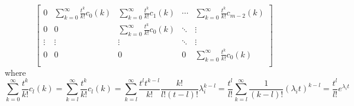 \documentclass[12pt,a4paper]{article}
\begin{document}
\begin{itemize}
\begin{enumerate}
\begin{equation}
\begin{bmatrix}
        0 & \sum_{k=0}^{\infty}\frac{t^{k}}{k!}c_{0}(k) & \sum_{k=0}^{\infty}\frac{t^{k}}{k!}c_{1}(k) & \cdots & \sum_{k=0}^{\infty}\frac{t^{k}}{k!}c_{m-2}(k) \\
        0 & 0 & \sum_{k=0}^{\infty}\frac{t^{k}}{k!}c_{0}(k) & \ddots & \vdots \\
        \vdots & \vdots & \vdots & \ddots & \vdots \\
        0 & 0 & 0  & 0 & \sum_{k=0}^{\infty}\frac{t^{k}}{k!}c_{0}(k) \\
      \end{bmatrix}
    \end{equation}
    where
    \begin{equation}\nonumber%
      \sum_{k=0}^{\infty}\frac{t^{k}}{k!}c_{l}(k)
      = 
      \sum_{k=l}^{\infty}\frac{t^{k}}{k!}c_{l}(k)
      = 
      \sum_{k=l}^{\infty}\frac{t^{l}t^{k-l}}{k!}\frac{k!}{l!(t-l)!}\lambda_{i}^{k-l}
      = 
      \frac{t^{l}}{l!}\sum_{k=l}^{\infty}\frac{1}{(k-l)!}(\lambda_{i}t)^{k-l}
      = 
      \frac{t^{l}}{l!}e^{\lambda_{i}t}
    \end{equation}


\end{enumerate}
\end{itemize}
\end{document}
